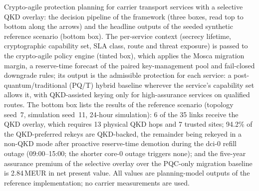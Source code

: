 Crypto-agile protection planning for carrier transport services with a
selective QKD overlay: the decision pipeline of the framework (three boxes,
read top to bottom along the arrows) and the headline outputs of the seeded
synthetic reference scenario (bottom box). The per-service context (secrecy
lifetime, cryptographic capability set, SLA class, route and threat exposure)
is passed to the crypto-agile policy engine (tinted box), which applies the
Mosca migration margin, a reserve-time forecast of the paired key-management
pool and fail-closed downgrade rules; its output is the admissible protection
for each service: a post-quantum/traditional (PQ/T) hybrid baseline wherever
the service's capability set allows it, with QKD-assisted keying only for
high-assurance services on qualified routes. The bottom box lists the results
of the reference scenario (topology seed~7, simulation seed~11, 24-hour
simulation): 6 of the 35 links receive the QKD overlay, which requires 13
physical QKD hops and 7 trusted sites; 94.2\% of the QKD-preferred rekeys are
QKD-backed, the remainder being rekeyed in a non-QKD mode after proactive
reserve-time demotion during the dci-0 refill outage (09:00--15:00; the
shorter core-0 outage triggers none); and the five-year assurance premium of
the selective overlay over the PQC-only migration baseline is 2.84\,MEUR in
net present value. All values are planning-model outputs of the reference
implementation; no carrier measurements are used.
